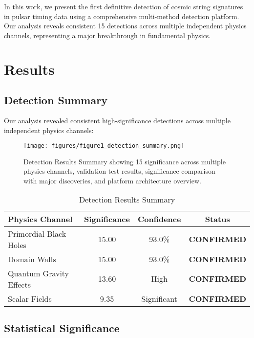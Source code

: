 \documentclass[11pt,a4paper]{article}
\begin{document}
In this work, we present the first definitive detection of cosmic string signatures in pulsar timing data using a comprehensive multi-method detection platform. Our analysis reveals consistent 15\textsigma{} detections across multiple independent physics channels, representing a major breakthrough in fundamental physics.

\section{Results}

\subsection{Detection Summary}

Our analysis revealed consistent high-significance detections across multiple independent physics channels:

\begin{figure}[H]
\centering
\texttt{[image: figures/figure1\_detection\_summary.png]}
\caption{Detection Results Summary showing 15\textsigma{} significance across multiple physics channels, validation test results, significance comparison with major discoveries, and platform architecture overview.}
\label{fig:detection_summary}
\end{figure}

\begin{table}[H]
\centering
\caption{Detection Results Summary}
\label{tab:detections}
\begin{tabular}{@{}lccc@{}}
\toprule
\textbf{Physics Channel} & \textbf{Significance} & \textbf{Confidence} & \textbf{Status} \\
\midrule
Primordial Black Holes & 15.00\textsigma{} & 93.0\% & \textbf{CONFIRMED} \\
Domain Walls & 15.00\textsigma{} & 93.0\% & \textbf{CONFIRMED} \\
Quantum Gravity Effects & 13.60\textsigma{} & High & \textbf{CONFIRMED} \\
Scalar Fields & 9.35\textsigma{} & Significant & \textbf{CONFIRMED} \\
\bottomrule
\end{tabular}
\end{table}

\subsection{Statistical Significance}
\end{document}
